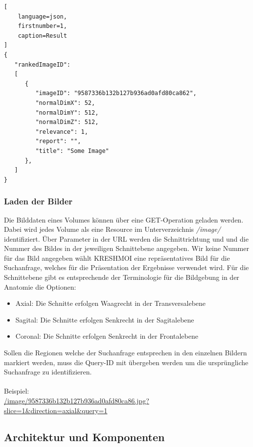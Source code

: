 \begin{lstlisting}[
	language=json,
	firstnumber=1,
	caption=Result
]
{
   "rankedImageID": 
   [
      {
         "imageID": "9587336b132b127b936ad0afd80ca862",
         "normalDimX": 52,
         "normalDimY": 512,
         "normalDimZ": 512,
         "relevance": 1,
         "report": "",
         "title": "Some Image"
      },
   ]
}
\end{lstlisting}

\subsubsection{Laden der Bilder}
\label{sec:Laden der Bilder}
Die Bilddaten eines Volumes können über eine GET-Operation geladen werden.
Dabei wird jedes Volume als eine Resource im Unterverzeichnis \textit{/image/} identifiziert.
Über Parameter in der URL werden die Schnittrichtung und und die Nummer des Bildes in der jeweiligen Schnittebene angegeben.
Wir keine Nummer für das Bild angegeben wählt KRESHMOI eine repräsentatives Bild für die Suchanfrage, welches für die Präsentation der Ergebnisse verwendet wird.
Für die Schnittebene gibt es entsprechende der Terminologie für die Bildgebung in der Anatomie die Optionen:
\begin{itemize}
	\item Axial: Die Schnitte erfolgen Waagrecht in der Transversalebene
	\item Sagital: Die Schnitte erfolgen Senkrecht in der Sagitalebene
	\item Coronal: Die Schnitte erfolgen Senkrecht in der Frontalebene 
\end{itemize}
Sollen die Regionen welche der Suchanfrage entsprechen in den einzelnen Bildern markiert werden, muss die Query-ID mit übergeben werden um die ursprüngliche Suchanfrage zu identifizieren.
\\
\\
Beispiel:
\\
\url{/image/9587336b132b127b936ad0afd80ca86.jpg?slice=1&direction=axial&query=1}

\subsection{Architektur und Komponenten}
\label{sec:Architektur und Komponenten}

